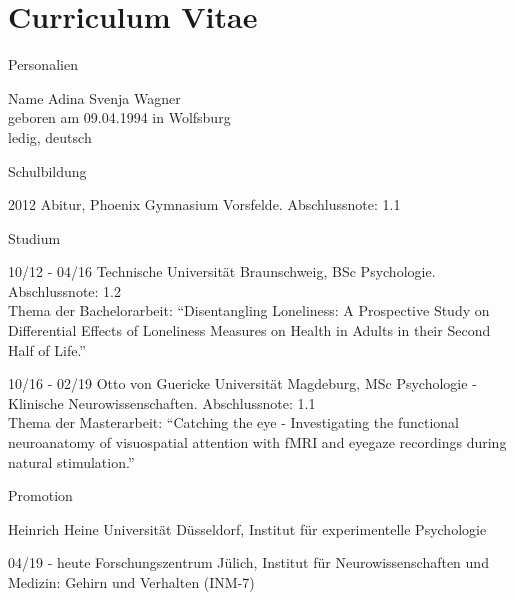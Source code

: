 
\chapter{Curriculum Vitae}


\begin{cv}{}
\begin{cvlist}{Personalien}
	\item[Name]
		Adina Svenja Wagner \\
		geboren am 09.04.1994 in Wolfsburg \\
		ledig, deutsch
\end{cvlist}
%
\begin{cvlist}{Schulbildung}
	\item[2012] Abitur, Phoenix Gymnasium Vorsfelde. Abschlussnote: 1.1
\end{cvlist}
%
\begin{cvlist}{Studium}
	\item[10/12 - 04/16] Technische Universität Braunschweig, BSc Psychologie. Abschlussnote: 1.2
	\\[0.5\baselineskip]
    Thema der Bachelorarbeit: \enquote{Disentangling Loneliness: A Prospective Study on Differential Effects of
	Loneliness Measures on Health in Adults in their Second Half of Life.}
	\item[10/16 - 02/19] Otto von Guericke Universität Magdeburg, MSc Psychologie - Klinische Neurowissenschaften. Abschlussnote: 1.1 
	\\[0.5\baselineskip]
	Thema der Masterarbeit: \enquote{Catching the eye - Investigating the functional neuroanatomy of visuospatial
	attention with fMRI and eyegaze recordings during natural stimulation.}
\end{cvlist}
%
\begin{cvlist}{Promotion}
	\item Heinrich Heine Universität Düsseldorf, Institut für experimentelle Psychologie
	\item[04/19 - heute]  Forschungszentrum Jülich, Institut für Neurowissenschaften und Medizin: Gehirn und Verhalten (INM-7)
\end{cvlist}

\end{cv}
